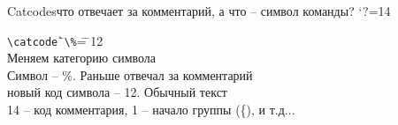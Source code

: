 \begin{frame}[fragile]{Catcodes\magicPage}{что отвечает за комментарий, а что -- символ команды?}\relax
\catcode`?=14
    \footnotesize
    \begin{tabbing}
     
        \lstinline|\catcode`|\= \lstinline|\%|\= = \= 12\\ 
        Меняем категорию символа\> \> \> \\
        \> Символ -- \%. Раньше отвечал за комментарий \> \> \\
        \> \> \> новый код символа -- 12. Обычный текст\\
        \> \> \> \tiny 14 -- код комментария, 1 -- начало группы (\{), и т.д...
    
    \end{tabbing}  \vspace{-0.5cm}
    
    
\end{frame}

